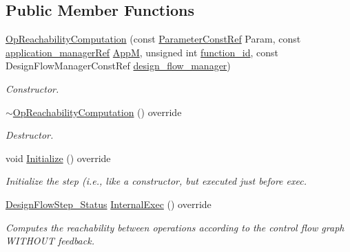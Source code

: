 \subsection*{Public Member Functions}
\begin{DoxyCompactItemize}
\item 
\hyperlink{classOpReachabilityComputation_aa13c82cc0275ae96b5c315158d272419}{Op\+Reachability\+Computation} (const \hyperlink{Parameter_8hpp_a37841774a6fcb479b597fdf8955eb4ea}{Parameter\+Const\+Ref} Param, const \hyperlink{application__manager_8hpp_a04ccad4e5ee401e8934306672082c180}{application\+\_\+manager\+Ref} \hyperlink{classFrontendFlowStep_a0ac0d8db2a378416583f51c4faa59d15}{AppM}, unsigned int \hyperlink{classFunctionFrontendFlowStep_a58ef2383ad1a212a8d3f396625a4b616}{function\+\_\+id}, const Design\+Flow\+Manager\+Const\+Ref \hyperlink{classDesignFlowStep_ab770677ddf087613add30024e16a5554}{design\+\_\+flow\+\_\+manager})
\begin{DoxyCompactList}\small\item\em Constructor. \end{DoxyCompactList}\item 
\hyperlink{classOpReachabilityComputation_a69178b27ad4de132945101c219f92f8e}{$\sim$\+Op\+Reachability\+Computation} () override
\begin{DoxyCompactList}\small\item\em Destructor. \end{DoxyCompactList}\item 
void \hyperlink{classOpReachabilityComputation_a64280ac1c3901738ef28fd4aaaece2d8}{Initialize} () override
\begin{DoxyCompactList}\small\item\em Initialize the step (i.\+e., like a constructor, but executed just before exec. \end{DoxyCompactList}\item 
\hyperlink{design__flow__step_8hpp_afb1f0d73069c26076b8d31dbc8ebecdf}{Design\+Flow\+Step\+\_\+\+Status} \hyperlink{classOpReachabilityComputation_ae8ff7b0bd968398819a90254ac482e5c}{Internal\+Exec} () override
\begin{DoxyCompactList}\small\item\em Computes the reachability between operations according to the control flow graph W\+I\+T\+H\+O\+UT feedback. \end{DoxyCompactList}\end{DoxyCompactItemize}
